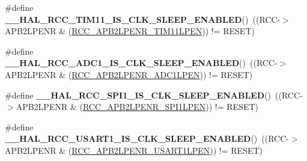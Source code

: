 \begin{DoxyCompactItemize}
\item 
\hypertarget{group___r_c_c___a_p_b2___clock___sleep___enable___disable___status_ga4eb8d9a7dcfdba9b830f54c0f19c87c4}{\#define {\bfseries \-\_\-\-\_\-\-H\-A\-L\-\_\-\-R\-C\-C\-\_\-\-T\-I\-M11\-\_\-\-I\-S\-\_\-\-C\-L\-K\-\_\-\-S\-L\-E\-E\-P\-\_\-\-E\-N\-A\-B\-L\-E\-D}()~((R\-C\-C-\/$>$A\-P\-B2\-L\-P\-E\-N\-R \& (\hyperlink{group___peripheral___registers___bits___definition_gad43fcaa4f4d6fb2b590a6ffee31f8c94}{R\-C\-C\-\_\-\-A\-P\-B2\-L\-P\-E\-N\-R\-\_\-\-T\-I\-M11\-L\-P\-E\-N})) != R\-E\-S\-E\-T)}\label{group___r_c_c___a_p_b2___clock___sleep___enable___disable___status_ga4eb8d9a7dcfdba9b830f54c0f19c87c4}

\item 
\hypertarget{group___r_c_c___a_p_b2___clock___sleep___enable___disable___status_gaf477ab254684bdedec1dd28ddd7585ed}{\#define {\bfseries \-\_\-\-\_\-\-H\-A\-L\-\_\-\-R\-C\-C\-\_\-\-A\-D\-C1\-\_\-\-I\-S\-\_\-\-C\-L\-K\-\_\-\-S\-L\-E\-E\-P\-\_\-\-E\-N\-A\-B\-L\-E\-D}()~((R\-C\-C-\/$>$A\-P\-B2\-L\-P\-E\-N\-R \& (\hyperlink{group___peripheral___registers___bits___definition_ga126a8791f77cecc599e32d2c882a4dab}{R\-C\-C\-\_\-\-A\-P\-B2\-L\-P\-E\-N\-R\-\_\-\-A\-D\-C1\-L\-P\-E\-N})) != R\-E\-S\-E\-T)}\label{group___r_c_c___a_p_b2___clock___sleep___enable___disable___status_gaf477ab254684bdedec1dd28ddd7585ed}

\item 
\hypertarget{group___r_c_c___a_p_b2___clock___sleep___enable___disable___status_ga2db4e1edb831584a39e791c16edfea28}{\#define {\bfseries \-\_\-\-\_\-\-H\-A\-L\-\_\-\-R\-C\-C\-\_\-\-S\-P\-I1\-\_\-\-I\-S\-\_\-\-C\-L\-K\-\_\-\-S\-L\-E\-E\-P\-\_\-\-E\-N\-A\-B\-L\-E\-D}()~((R\-C\-C-\/$>$A\-P\-B2\-L\-P\-E\-N\-R \& (\hyperlink{group___peripheral___registers___bits___definition_ga2c6729058e54f4b8f8ae01d5b3586aaa}{R\-C\-C\-\_\-\-A\-P\-B2\-L\-P\-E\-N\-R\-\_\-\-S\-P\-I1\-L\-P\-E\-N})) != R\-E\-S\-E\-T)}\label{group___r_c_c___a_p_b2___clock___sleep___enable___disable___status_ga2db4e1edb831584a39e791c16edfea28}

\item 
\hypertarget{group___r_c_c___a_p_b2___clock___sleep___enable___disable___status_ga1059a391a514543547809a524b4cdf0d}{\#define {\bfseries \-\_\-\-\_\-\-H\-A\-L\-\_\-\-R\-C\-C\-\_\-\-U\-S\-A\-R\-T1\-\_\-\-I\-S\-\_\-\-C\-L\-K\-\_\-\-S\-L\-E\-E\-P\-\_\-\-E\-N\-A\-B\-L\-E\-D}()~((R\-C\-C-\/$>$A\-P\-B2\-L\-P\-E\-N\-R \& (\hyperlink{group___peripheral___registers___bits___definition_gab8b429bc8d52abd1ba3818a82542bb98}{R\-C\-C\-\_\-\-A\-P\-B2\-L\-P\-E\-N\-R\-\_\-\-U\-S\-A\-R\-T1\-L\-P\-E\-N})) != R\-E\-S\-E\-T)}\label{group___r_c_c___a_p_b2___clock___sleep___enable___disable___status_ga1059a391a514543547809a524b4cdf0d}


\end{DoxyCompactItemize}
